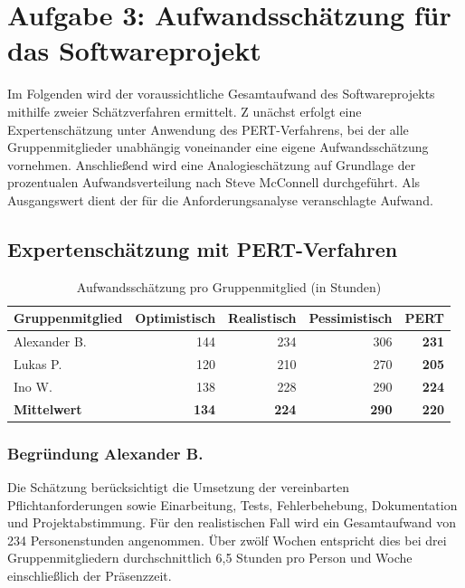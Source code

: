 \documentclass[a4paper,10pt]{article}
\begin{document}
        \section*{Aufgabe 3: Aufwandsschätzung für das Softwareprojekt}
        Im Folgenden wird der voraussichtliche Gesamtaufwand des Softwareprojekts mithilfe zweier Schätzverfahren ermittelt. Z
        unächst erfolgt eine Expertenschätzung unter Anwendung des PERT-Verfahrens, bei der alle Gruppenmitglieder unabhängig voneinander eine eigene Aufwandsschätzung vornehmen.
        Anschlie\ss{}end wird eine Analogieschätzung auf Grundlage der prozentualen Aufwandsverteilung nach Steve McConnell durchgeführt.
    Als Ausgangswert dient der für die Anforderungsanalyse veranschlagte Aufwand.

        \subsection*{Expertenschätzung mit PERT-Verfahren}
        \begin{table}[h]
            \centering
            \caption{Aufwandsschätzung pro Gruppenmitglied (in Stunden)}
            \begin{tabular}{lrrrr}
                \hline

                \textbf{Gruppenmitglied} & \textbf{Optimistisch} & \textbf{Realistisch} & \textbf{Pessimistisch} & \textbf{PERT} \\
                \hline

                Alexander B.             & 144                   & 234                  & 306                    & \textbf{231}  \\
                Lukas P.                 & 120                   & 210                  & 270                    & \textbf{205}  \\
                Ino W.                   & 138                   & 228                  & 290                    & \textbf{224}  \\
                \midrule
                \textbf{Mittelwert}      & \textbf{134}          & \textbf{224}         & \textbf{290}           & \textbf{220}  \\

            \end{tabular}
        \end{table}

        \subsubsection*{Begründung Alexander B.}
        Die Schätzung berücksichtigt die Umsetzung der vereinbarten Pflichtanforderungen sowie Einarbeitung, Tests, Fehlerbehebung, Dokumentation und Projektabstimmung. Für den realistischen Fall wird ein Gesamtaufwand von 234 Personenstunden angenommen. Über zwölf Wochen entspricht dies bei drei Gruppenmitgliedern durchschnittlich 6,5 Stunden pro Person und Woche einschlie\ss{}lich der Präsenzzeit.
\end{document}
